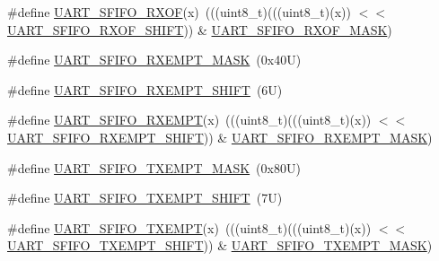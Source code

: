 \begin{DoxyCompactItemize}
\item 
\#define \mbox{\hyperlink{group___u_a_r_t___register___masks_ga94fd3d784999bb71baa0ffa5154520c2}{U\+A\+R\+T\+\_\+\+S\+F\+I\+F\+O\+\_\+\+R\+X\+OF}}(x)~(((uint8\+\_\+t)(((uint8\+\_\+t)(x)) $<$$<$ \mbox{\hyperlink{group___u_a_r_t___register___masks_gab6ac120e58576ef4ff7f368b071c9f63}{U\+A\+R\+T\+\_\+\+S\+F\+I\+F\+O\+\_\+\+R\+X\+O\+F\+\_\+\+S\+H\+I\+FT}})) \& \mbox{\hyperlink{group___u_a_r_t___register___masks_ga6caec5dcdf0ff7a7498279579ca8003e}{U\+A\+R\+T\+\_\+\+S\+F\+I\+F\+O\+\_\+\+R\+X\+O\+F\+\_\+\+M\+A\+SK}})
\item 
\#define \mbox{\hyperlink{group___u_a_r_t___register___masks_ga672339d2930ef7864126ea9938d2c18d}{U\+A\+R\+T\+\_\+\+S\+F\+I\+F\+O\+\_\+\+R\+X\+E\+M\+P\+T\+\_\+\+M\+A\+SK}}~(0x40\+U)
\item 
\#define \mbox{\hyperlink{group___u_a_r_t___register___masks_ga437bd92a0e905d88bf92615135b0672f}{U\+A\+R\+T\+\_\+\+S\+F\+I\+F\+O\+\_\+\+R\+X\+E\+M\+P\+T\+\_\+\+S\+H\+I\+FT}}~(6\+U)
\item 
\#define \mbox{\hyperlink{group___u_a_r_t___register___masks_gac6de42a22258666ffa8ea8120e822694}{U\+A\+R\+T\+\_\+\+S\+F\+I\+F\+O\+\_\+\+R\+X\+E\+M\+PT}}(x)~(((uint8\+\_\+t)(((uint8\+\_\+t)(x)) $<$$<$ \mbox{\hyperlink{group___u_a_r_t___register___masks_ga437bd92a0e905d88bf92615135b0672f}{U\+A\+R\+T\+\_\+\+S\+F\+I\+F\+O\+\_\+\+R\+X\+E\+M\+P\+T\+\_\+\+S\+H\+I\+FT}})) \& \mbox{\hyperlink{group___u_a_r_t___register___masks_ga672339d2930ef7864126ea9938d2c18d}{U\+A\+R\+T\+\_\+\+S\+F\+I\+F\+O\+\_\+\+R\+X\+E\+M\+P\+T\+\_\+\+M\+A\+SK}})
\item 
\#define \mbox{\hyperlink{group___u_a_r_t___register___masks_ga50a1813a0e695d319434adaa157a4c3a}{U\+A\+R\+T\+\_\+\+S\+F\+I\+F\+O\+\_\+\+T\+X\+E\+M\+P\+T\+\_\+\+M\+A\+SK}}~(0x80\+U)
\item 
\#define \mbox{\hyperlink{group___u_a_r_t___register___masks_ga1856b521baf09271f8085380ef6e1cc5}{U\+A\+R\+T\+\_\+\+S\+F\+I\+F\+O\+\_\+\+T\+X\+E\+M\+P\+T\+\_\+\+S\+H\+I\+FT}}~(7\+U)
\item 
\#define \mbox{\hyperlink{group___u_a_r_t___register___masks_gae3bc3c25c56a4a524b23b537c4cbaf2c}{U\+A\+R\+T\+\_\+\+S\+F\+I\+F\+O\+\_\+\+T\+X\+E\+M\+PT}}(x)~(((uint8\+\_\+t)(((uint8\+\_\+t)(x)) $<$$<$ \mbox{\hyperlink{group___u_a_r_t___register___masks_ga1856b521baf09271f8085380ef6e1cc5}{U\+A\+R\+T\+\_\+\+S\+F\+I\+F\+O\+\_\+\+T\+X\+E\+M\+P\+T\+\_\+\+S\+H\+I\+FT}})) \& \mbox{\hyperlink{group___u_a_r_t___register___masks_ga50a1813a0e695d319434adaa157a4c3a}{U\+A\+R\+T\+\_\+\+S\+F\+I\+F\+O\+\_\+\+T\+X\+E\+M\+P\+T\+\_\+\+M\+A\+SK}})
\end{DoxyCompactItemize}
